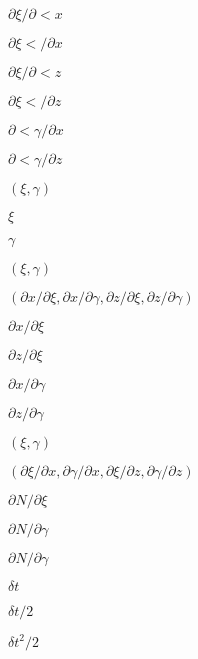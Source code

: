 \documentclass{article}
\begin{document}
$\partial \xi / \partial
         < x$
\pagebreak

$\partial \xi
         < / \partial x$
\pagebreak

$\partial \xi / \partial
         < z$
\pagebreak

$\partial \xi
         < / \partial z$
\pagebreak

$\partial
         < \gamma / \partial x$
\pagebreak

$\partial
         < \gamma / \partial z$
\pagebreak

$(\xi, \gamma)$
\pagebreak

$ \xi $
\pagebreak

$ \gamma $
\pagebreak

$ (\xi, \gamma) $
\pagebreak

$ (\partial x/\partial \xi, \partial x/\partial \gamma,
\partial z/\partial \xi, \partial z/\partial \gamma) $
\pagebreak

$ \partial x/\partial \xi $
\pagebreak

$ \partial z/\partial \xi $
\pagebreak

$ \partial x/\partial \gamma $
\pagebreak

$ \partial z/\partial \gamma $
\pagebreak

$ (\xi,
\gamma) $
\pagebreak

$ (\partial \xi/ \partial x, \partial \gamma/ \partial x,
\partial \xi/ \partial z, \partial \gamma/ \partial z) $
\pagebreak

$ \partial N/\partial \xi $
\pagebreak

$ \partial N/\partial
\gamma $
\pagebreak

$ \partial N/\partial \gamma
$
\pagebreak

$ \delta t $
\pagebreak

$ \delta t / 2 $
\pagebreak

$ \delta t^2 / 2 $
\pagebreak
\end{document}
